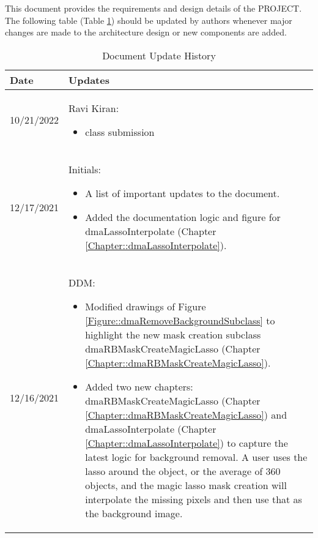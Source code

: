 This document provides the requirements and design details of the
PROJECT.  The following table (Table \ref{Table::UpdateHistory}) should be
updated by authors whenever major changes are made to the architecture
design or new components are added.  

\begin{longtable}{|l||p{13.5cm}|}
\caption{Document Update History \label{Table::UpdateHistory}}\\
\hline
\textbf{Date} & \textbf{Updates} \\
\hline 
\endhead

10/21/2022 & Ravi Kiran:
\begin{itemize}[topsep=0pt,itemsep=0pt,parsep=0pt,partopsep=0pt,leftmargin=12pt]

\item {class submission}
\end{itemize} 
\\ \hline


12/17/2021 & Initials:
\begin{itemize}[topsep=0pt,itemsep=0pt,parsep=0pt,partopsep=0pt,leftmargin=12pt]
\item A list of important updates to the document.
\item Added the documentation logic and figure for dmaLassoInterpolate 
(Chapter \ref{Chapter::dmaLassoInterpolate}). 
\end{itemize} 
\\ \hline

12/16/2021 & DDM:
\begin{itemize}[topsep=0pt,itemsep=0pt,parsep=0pt,partopsep=0pt,leftmargin=12pt]
\item Modified drawings of Figure \ref{Figure::dmaRemoveBackgroundSubclass} to
highlight the new mask creation subclass dmaRBMaskCreateMagicLasso (Chapter 
\ref{Chapter::dmaRBMaskCreateMagicLasso}).
\item Added two new chapters: dmaRBMaskCreateMagicLasso
(Chapter \ref{Chapter::dmaRBMaskCreateMagicLasso}) and dmaLassoInterpolate
(Chapter \ref{Chapter::dmaLassoInterpolate}) to capture the latest logic for 
background removal.  A user uses the lasso around the object, or the average 
of 360 objects, and the magic lasso mask creation will interpolate the missing
pixels and then use that as the background image. 
\end{itemize} 
\\ \hline


\end{longtable}

